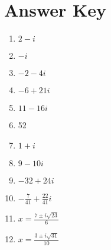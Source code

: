 \newpage

\section{Answer Key}

\begin{enumerate}
	\item $2-i$
    \item $-i$
    \item $-2-4i$
    \item $-6+21i$
    \item $11-16i$
    \item 52
    \item $1 + i$
    \item $9-10i$
    \item $-32+24i$
    \item $-\frac{7}{41}+\frac{22}{41}i$
    
    \item $x = \frac{7 \pm i\sqrt{23}}{6}$
    \item $x = \frac{3 \pm i \sqrt{31}}{10}$
\end{enumerate}